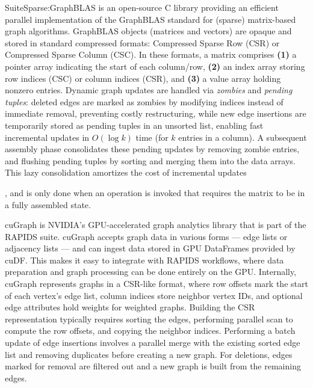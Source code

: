 SuiteSparse:GraphBLAS \cite{davis2023algorithm, davis2019algorithm} is an open-source C library providing an efficient parallel implementation of the GraphBLAS standard for (sparse) matrix-based graph algorithms. GraphBLAS objects (matrices and vectors) are opaque and stored in standard compressed formats: Compressed Sparse Row (CSR) or Compressed Sparse Column (CSC). In these formats, a matrix comprises \textbf{(1)} a pointer array indicating the start of each column/row, \textbf{(2)} an index array storing row indices (CSC) or column indices (CSR), and \textbf{(3)} a value array holding nonzero entries. Dynamic graph updates are handled via \textit{zombies} and \textit{pending tuples}: deleted edges are marked as zombies by modifying indices instead of immediate removal, preventing costly restructuring, while new edge insertions are temporarily stored as pending tuples in an unsorted list, enabling fast incremental updates in $O(\log k)$ time (for $k$ entries in a column). A subsequent assembly phase consolidates these pending updates by removing zombie entries, and flushing pending tuples by sorting and merging them into the data arrays. This lazy consolidation amortizes the cost of incremental updates, and is only done when an operation is invoked that requires the matrix to be in a fully assembled state.

cuGraph \cite{kang2023cugraph} is NVIDIA's GPU-accelerated graph analytics library that is part of the RAPIDS suite. cuGraph accepts graph data in various forms --- edge lists or adjacency lists --- and can ingest data stored in GPU DataFrames provided by cuDF. This makes it easy to integrate with RAPIDS workflows, where data preparation and graph processing can be done entirely on the GPU. Internally, cuGraph represents graphs in a CSR-like format, where row offsets mark the start of each vertex's edge list, column indices store neighbor vertex IDs, and optional edge attributes hold weights for weighted graphs. Building the CSR representation typically requires sorting the edges, performing parallel scan to compute the row offsets, and copying the neighbor indices. Performing a batch update of edge insertions involves a parallel merge with the existing sorted edge list and removing duplicates before creating a new graph. For deletions, edges marked for removal are filtered out and a new graph is built from the remaining edges.

